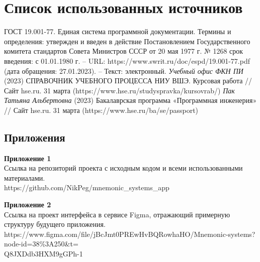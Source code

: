 \documentclass[draft]{article}
\newcommand\zz[1]{\par{\normalsize\strut #1} \hfill\ignorespaces}
\begin{document}
\section*{Список использованных источников}
\begin{thebibliography}{}
 ГОСТ 19.001-77. Единая система программной документации. Термины и определения: утвержден и введен в действие Постановлением Государственного комитета стандартов Совета Министров СССР от 20 мая 1977 г. № 1268 срок введения: с 01.01.1980 г. – URL: https://www.swrit.ru/doc/espd/19.001-77.pdf (дата обращения: 27.01.2023). – Текст: электронный.
 \textit{Учебный офис ФКН ПИ} (2023) СПРАВОЧНИК УЧЕБНОГО ПРОЦЕССА НИУ ВШЭ. Курсовая работа // Сайт hse.ru. 31 марта (https://www.hse.ru/studyspravka/kursovrab/)
 \textit{Пак Татьяна Альбертовна} (2023) Бакалаврская программа «Программная инженерия» // Сайт hse.ru. 31 марта (https://www.hse.ru/ba/se/passport)
\end{thebibliography}
\newpage
\begin{center}
\section*{Приложения}
\end{center}
\zz{}\textbf{Приложение 1\\}
Ссылка на репозиторий проекта с исходным кодом и всеми использованными материалами.\\
https://github.com/NikPeg/mnemonic\_systems\_app\\
\zz{}\textbf{Приложение 2\\}
Ссылка на проект интерфейса в сервисе Figma, отражающий примерную структуру будущего приложения.\\
https://www.figma.com/file/jBcJmt0PREwHvBQRowhaHO/Mnemonic-systems?node-id=38\%3A250\&t=\\
Q8JXDdb3HXM9gGPh-1\\
\end{document}
